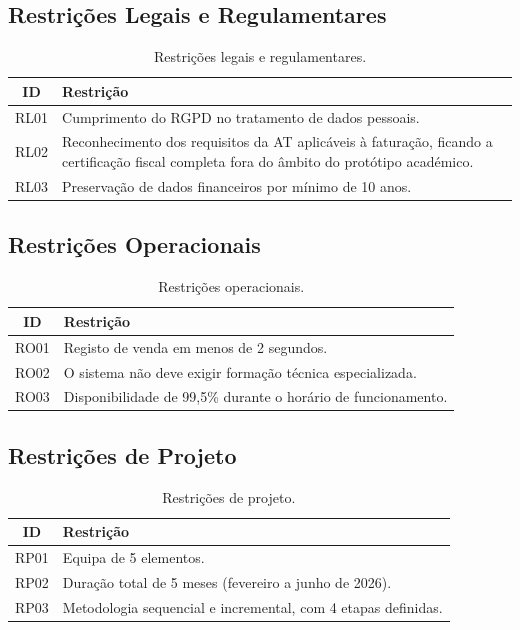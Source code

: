     \subsection{Restrições Legais e Regulamentares}
    \begin{table}[H]
    \centering
    \begin{tabular}{|c|p{12cm}|}
    \hline
    \textbf{ID} & \textbf{Restrição} \\
    \hline
    RL01 & Cumprimento do RGPD no tratamento de dados pessoais. \\
    \hline
    RL02 & Reconhecimento dos requisitos da AT aplicáveis à faturação, ficando a certificação fiscal completa fora do âmbito do protótipo académico. \\
    \hline
    RL03 & Preservação de dados financeiros por mínimo de 10 anos. \\
    \hline
    \end{tabular}
    \caption{Restrições legais e regulamentares.}
    \label{tab:restricoes_legais}
    \end{table}

    \subsection{Restrições Operacionais}
    \begin{table}[H]
    \centering
    \begin{tabular}{|c|p{12cm}|}
    \hline
    \textbf{ID} & \textbf{Restrição} \\
    \hline
    RO01 & Registo de venda em menos de 2 segundos. \\
    \hline
    RO02 & O sistema não deve exigir formação técnica especializada. \\
    \hline
    RO03 & Disponibilidade de 99,5\% durante o horário de funcionamento. \\
    \hline
    \end{tabular}
    \caption{Restrições operacionais.}
    \label{tab:restricoes_operacionais}
    \end{table}

    \subsection{Restrições de Projeto}
    \begin{table}[H]
    \centering
    \begin{tabular}{|c|p{12cm}|}
    \hline
    \textbf{ID} & \textbf{Restrição} \\
    \hline
    RP01 & Equipa de 5 elementos. \\
    \hline
    RP02 & Duração total de 5 meses (fevereiro a junho de 2026). \\
    \hline
    RP03 & Metodologia sequencial e incremental, com 4 etapas definidas. \\
    \hline
    \end{tabular}
    \caption{Restrições de projeto.}
    \label{tab:restricoes_projeto}
    \end{table}

